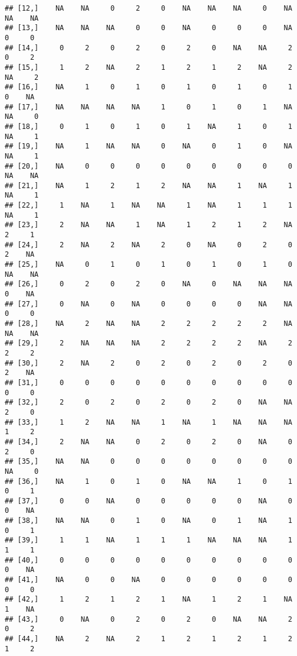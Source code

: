 \documentclass[
]{article}
\begin{document}
\begin{verbatim}
## [12,]    NA    NA     0     2     0    NA    NA    NA     0    NA    NA    NA
## [13,]    NA    NA    NA     0     0    NA     0     0     0    NA     0     0
## [14,]     0     2     0     2     0     2     0    NA    NA     2     0     2
## [15,]     1     2    NA     2     1     2     1     2    NA     2    NA     2
## [16,]    NA     1     0     1     0     1     0     1     0     1     0    NA
## [17,]    NA    NA    NA    NA     1     0     1     0     1    NA    NA     0
## [18,]     0     1     0     1     0     1    NA     1     0     1    NA     1
## [19,]    NA     1    NA    NA     0    NA     0     1     0    NA    NA     1
## [20,]    NA     0     0     0     0     0     0     0     0     0    NA    NA
## [21,]    NA     1     2     1     2    NA    NA     1    NA     1    NA     1
## [22,]     1    NA     1    NA    NA     1    NA     1     1     1    NA     1
## [23,]     2    NA    NA     1    NA     1     2     1     2    NA     2     1
## [24,]     2    NA     2    NA     2     0    NA     0     2     0     2    NA
## [25,]    NA     0     1     0     1     0     1     0     1     0    NA    NA
## [26,]     0     2     0     2     0    NA     0    NA    NA    NA     0    NA
## [27,]     0    NA     0    NA     0     0     0     0    NA    NA     0     0
## [28,]    NA     2    NA    NA     2     2     2     2     2    NA    NA    NA
## [29,]     2    NA    NA    NA     2     2     2     2    NA     2     2     2
## [30,]     2    NA     2     0     2     0     2     0     2     0     2    NA
## [31,]     0     0     0     0     0     0     0     0     0     0     0     0
## [32,]     2     0     2     0     2     0     2     0    NA    NA     2     0
## [33,]     1     2    NA    NA     1    NA     1    NA    NA    NA     1     2
## [34,]     2    NA    NA     0     2     0     2     0    NA     0     2     0
## [35,]    NA    NA     0     0     0     0     0     0     0     0    NA     0
## [36,]    NA     1     0     1     0    NA    NA     1     0     1     0     1
## [37,]     0     0    NA     0     0     0     0     0    NA     0     0    NA
## [38,]    NA    NA     0     1     0    NA     0     1    NA     1     0     1
## [39,]     1     1    NA     1     1     1    NA    NA    NA     1     1     1
## [40,]     0     0     0     0     0     0     0     0     0     0     0    NA
## [41,]    NA     0     0    NA     0     0     0     0     0     0     0     0
## [42,]     1     2     1     2     1    NA     1     2     1    NA     1    NA
## [43,]     0    NA     0     2     0     2     0    NA    NA     2     0     2
## [44,]    NA     2    NA     2     1     2     1     2     1     2     1     2

\end{verbatim}
\end{document}
